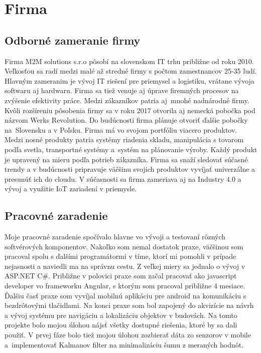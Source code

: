 \chapter{Firma} %

\section{Odborné zameranie firmy}
Firma M2M solutions s.r.o \cite{firma} pôsobí na slovenskom  IT  trhu približne od roku 2010. Veľkosťou sa radí medzi malé až stredné  firmy s počtom zamestnancov 25-35 ľudí. Hlavným zameranim je vývoj IT riešení pre priemysel  a logistiku, vrátane vývoja  softwaru aj hardwaru. Firma sa tiež venuje aj úprave firemných procesov  na zvýšenie efektivity práce.  Medzi zákazníkov patria aj~mnohé nadnárodné firmy.  Kvôli rozšíreniu  pôsobenia  firmy  sa  v roku 2017 otvorila  aj nemecká pobočka pod názvom Werks Revolution. Do budúcnosti firma plánuje otvoriť ďalšie pobočky na~Slovensku a v Poľsku.
Firma má  vo svojom portfóliu viacero produktov. Medzi nosné produkty patria  systémy riadenia skladu,  manipulácia s tovarom podľa svetla, transportné systémy a~systém na  plánovanie výroby. Každý produkt je upravený na mieru podľa potrieb zákazníka. Firma sa snaží sledovať súčasné trendy a v budúcnosti  pripravuje väčšinu svojich produktov  vyvíjať univerzálne a presunúť ich do cloudu.  V súčasnosti sa firma zameriava aj na Industry 4.0 a vývoj a využitie IoT zariadení v priemysle. 

\section{Pracovné zaradenie}
Moje pracovné zaradenie  spočívalo hlavne vo vývoji a testovaní rôzných softvérových komponentov. Nakoľko som nemal  dostatok praxe, väčšinou som pracoval spolu s ďalšími programátormi v tíme, ktorí mi pomohli v prípade nejasnosti  a naviedli ma na správnu cestu. Z veľkej miery  sa jednalo o vývoj v ASP.NET C\#. Približne v polovici praxe som začal pracovať ako javascript developer vo frameworku Angular, s ktorým som pracoval približne  4 mesiace. Ďalšiu časť praxe som vyvíjal mobilnú aplikáciu  pre android na komunikáciu s bezdrôtovými tlačidlami.  Na konci praxe som bol zapojený do akvizície na návrh a vývoj systému pre navigáciu a lokalizáciu objektov v budovách.  Na tomto projekte bolo mojou úlohou nájsť všetky dostupné riešenia, ktoré by  sa dali použiť. V prvej fáze bolo tiež mojou úlohou zozbierať dáta zo senzorov v mobile a~implementovať Kalmanov filter na minimalizáciu šumu z meraných hodnôt.